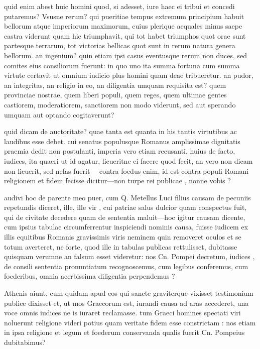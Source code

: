  quid enim abest huic homini quod, si adesset, iure haec ei tribui et concedi putaremus? Vsusne rerum? qui pueritiae tempus extremum principium habuit bellorum atque imperiorum maximorum, cuius plerique aequales minus saepe castra viderunt quam hic triumphavit, qui tot habet triumphos quot orae sunt partesque terrarum, tot victorias bellicas quot sunt in rerum natura genera bellorum. an ingenium? quin etiam ipsi casus eventusque rerum non duces, sed comites eius consiliorum fuerunt: in quo uno ita summa fortuna cum summa virtute certavit ut omnium iudicio plus homini quam deae tribueretur. an pudor, an integritas, an religio in eo, an diligentia umquam requisita est? quem provinciae nostrae, quem liberi populi, quem reges, quem ultimae gentes castiorem, moderatiorem, sanctiorem non modo viderunt, sed aut sperando umquam aut optando cogitaverunt?

 quid dicam de auctoritate? quae tanta est quanta in his tantis virtutibus ac laudibus esse debet. cui senatus populusque Romanus amplissimae dignitatis praemia dedit non postulanti, imperia vero etiam recusanti, huius de facto, iudices, ita quaeri ut id agatur, licueritne ei facere quod fecit, an vero non dicam non licuerit, sed nefas fuerit— contra foedus enim, id est contra populi Romani religionem et fidem fecisse dicitur—non turpe rei publicae , nonne vobis ?

 audivi hoc de parente meo puer, cum Q. Metellus Luci filius causam de pecuniis repetundis diceret, ille, ille vir , cui patriae salus dulcior quam conspectus fuit, qui de civitate decedere quam de sententia maluit—hoc igitur causam dicente, cum ipsius tabulae circumferrentur inspiciendi nominis causa, fuisse iudicem ex illis equitibus Romanis gravissimis viris neminem quin removeret oculos et se totum averteret, ne forte, quod ille in tabulas publicas rettulisset, dubitasse quisquam verumne an falsum esset videretur: nos Cn. Pompei decretum, iudices , de consili sententia pronuntiatum recognoscemus, cum legibus conferemus, cum foederibus, omnia acerbissima diligentia perpendemus ?

 Athenis aiunt, cum quidam apud eos qui sancte graviterque vixisset testimonium publice dixisset et, ut mos Graecorum est, iurandi causa ad aras accederet, una voce omnis iudices ne is iuraret reclamasse. tum Graeci homines spectati viri noluerunt religione videri potius quam veritate fidem esse constrictam : nos etiam in ipsa religione et legum et foederum conservanda qualis fuerit Cn. Pompeius dubitabimus?

